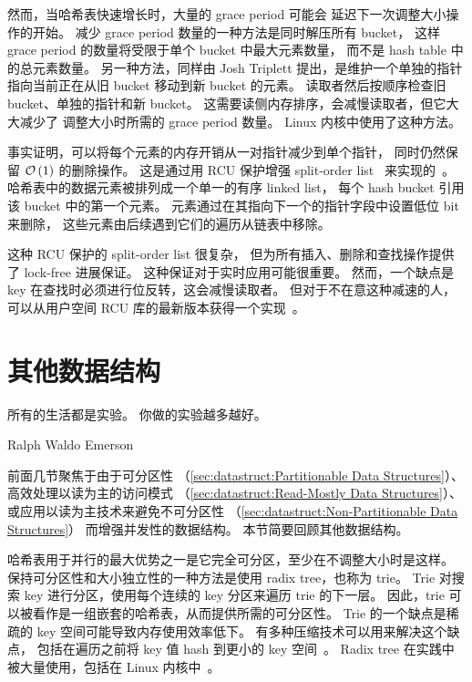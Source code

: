 然而，当哈希表快速增长时，大量的 grace period 可能会
延迟下一次调整大小操作的开始。
减少 grace period 数量的一种方法是同时解压所有 bucket，
这样 grace period 的数量将受限于单个 bucket 中最大元素数量，
而不是 hash table 中的总元素数量。
另一种方法，同样由 Josh Triplett 提出，是维护一个单独的指针
指向当前正在从旧 bucket 移动到新 bucket 的元素。
读取者然后按顺序检查旧 bucket、单独的指针和新 bucket。
这需要读侧内存排序，会减慢读取者，但它大大减少了
调整大小时所需的 grace period 数量。
Linux 内核中使用了这种方法。

事实证明，可以将每个元素的内存开销从一对指针减少到单个指针，
同时仍然保留 $\mathcal{O}\left(1\right)$ 的删除操作。
这是通过用 RCU 保护增强 split-order
list~\cite{OriShalev2006SplitOrderListHash}
来实现的~\cite{MathieuDesnoyers2009URCU,PaulMcKenney2013LWNURCUhash}。
哈希表中的数据元素被排列成一个单一的有序 linked list，
每个 hash bucket 引用该 bucket 中的第一个元素。
元素通过在其指向下一个的指针字段中设置低位 bit 来删除，
这些元素由后续遇到它们的遍历从链表中移除。

这种 RCU 保护的 split-order list 很复杂，
但为所有插入、删除和查找操作提供了 lock-free 进展保证。
这种保证对于实时应用可能很重要。
然而，一个缺点是 key 在查找时必须进行位反转，这会减慢读取者。
但对于不在意这种减速的人，
可以从用户空间 RCU 库的最新版本获得一个实现~\cite{MathieuDesnoyers2009URCU}。

\section{其他数据结构}
\label{sec:datastruct:Other Data Structures}
%
\epigraph{所有的生活都是实验。
	  你做的实验越多越好。}
	 {Ralph Waldo Emerson}

前面几节聚焦于由于可分区性
（\cref{sec:datastruct:Partitionable Data Structures}）、
高效处理以读为主的访问模式
（\cref{sec:datastruct:Read-Mostly Data Structures}）、
或应用以读为主技术来避免不可分区性
（\cref{sec:datastruct:Non-Partitionable Data Structures}）
而增强并发性的数据结构。
本节简要回顾其他数据结构。

哈希表用于并行的最大优势之一是它完全可分区，至少在不调整大小时是这样。
保持可分区性和大小独立性的一种方法是使用 radix tree，也称为 trie。
Trie 对搜索 key 进行分区，使用每个连续的 key 分区来遍历 trie 的下一层。
因此，trie 可以被看作是一组嵌套的哈希表，从而提供所需的可分区性。
Trie 的一个缺点是稀疏的 key 空间可能导致内存使用效率低下。
有多种压缩技术可以用来解决这个缺点，
包括在遍历之前将 key 值 hash 到更小的 key 空间~\cite{RobertOlsson2007Trash}。
Radix tree 在实践中被大量使用，包括在 Linux
内核中~\cite{NickPiggin2006radixtree}。

